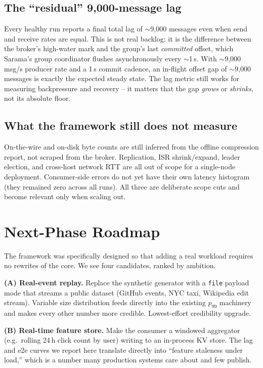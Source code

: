 \documentclass[conference]{IEEEtran}
\begin{document}
\subsection{The ``residual'' 9{,}000-message lag}
Every healthy run reports a final total lag of $\sim$9{,}000 messages
even when send and receive rates are equal. This is not real backlog:
it is the difference between the broker's high-water mark and the
group's last \emph{committed} offset, which Sarama's group coordinator
flushes asynchronously every $\sim$1\,s. With $\sim$9{,}000\,msg/s
producer rate and a 1\,s commit cadence, an in-flight offset gap of
$\sim$9{,}000 messages is exactly the expected steady state. The lag
metric still works for measuring backpressure and recovery -- it
matters that the gap \emph{grows} or \emph{shrinks}, not its absolute
floor.

\subsection{What the framework still does not measure}
On-the-wire and on-disk byte counts are still inferred from the
offline compression report, not scraped from the broker. Replication,
ISR shrink/expand, leader election, and cross-host network RTT are
all out of scope for a single-node deployment. Consumer-side errors
do not yet have their own latency histogram (they remained zero
across all runs). All three are deliberate scope cuts and become
relevant only when scaling out.

\section{Next-Phase Roadmap}
The framework was specifically designed so that adding a real
workload requires no rewrites of the core. We see four candidates,
ranked by ambition.

\textbf{(A) Real-event replay.} Replace the synthetic generator with a
\texttt{file} payload mode that streams a public dataset
(GitHub events, NYC taxi, Wikipedia edit stream). Variable size
distribution feeds directly into the existing $p_{99}$ machinery and
makes every other number more credible. Lowest-effort credibility upgrade.

\textbf{(B) Real-time feature store.} Make the consumer a windowed
aggregator (e.g.\ rolling 24\,h click count by user) writing to an
in-process KV store. The lag and e2e curves we report here translate
directly into ``feature staleness under load,'' which is a number
many production systems care about and few publish.
\end{document}
